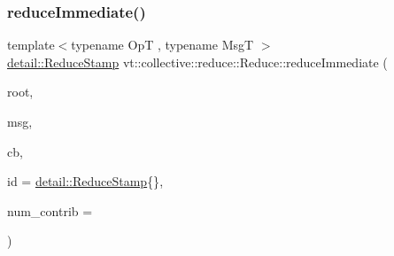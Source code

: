 \subsubsection{\texorpdfstring{reduce\+Immediate()}{reduceImmediate()}\hspace{0.1cm}{\footnotesize\ttfamily [4/8]}}
{\footnotesize\ttfamily template$<$typename OpT , typename MsgT $>$ \\
\hyperlink{namespacevt_1_1collective_1_1reduce_1_1detail_abcd205dec83706f347d55c7528bf2664}{detail\+::\+Reduce\+Stamp} vt\+::collective\+::reduce\+::\+Reduce\+::reduce\+Immediate (\begin{DoxyParamCaption}\item[{\hyperlink{namespacevt_a866da9d0efc19c0a1ce79e9e492f47e2}{Node\+Type} const \&}]{root,  }\item[{MsgT $\ast$}]{msg,  }\item[{\hyperlink{namespacevt_a57b238783d05de96bc2c4027f7073b7f}{Callback}$<$ MsgT $>$}]{cb,  }\item[{\hyperlink{namespacevt_1_1collective_1_1reduce_1_1detail_abcd205dec83706f347d55c7528bf2664}{detail\+::\+Reduce\+Stamp}}]{id = {\ttfamily \hyperlink{namespacevt_1_1collective_1_1reduce_1_1detail_abcd205dec83706f347d55c7528bf2664}{detail\+::\+Reduce\+Stamp}\{\}},  }\item[{\hyperlink{structvt_1_1collective_1_1reduce_1_1_reduce_a6c3e63aca10c31d2823b0b18cf9762a4}{Reduce\+Num\+Type} const \&}]{num\+\_\+contrib = {} }\end{DoxyParamCaption})\hspace{0.3cm}{\ttfamily [inline]}}

\mbox{\label{structvt_1_1collective_1_1reduce_1_1_reduce_aa67345409ff38a10715ee87821b02e10}} 
